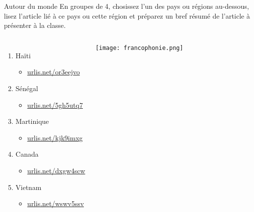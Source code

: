 \begin{frame}{Autour du monde}
  En groupes de 4, chosissez l'un des pays ou régions au-dessous, lisez l'article lié à ce pays ou cette région et préparez un bref résumé  de l'article à présenter à la classe.
  \begin{columns}
      \begin{enumerate}
        \item Haïti
        \begin{itemize}
          \item \href{https://urlis.net/or3eejvo}{urlis.net/or3eejvo}
        \end{itemize}
        \item Sénégal
        \begin{itemize}
          \item \href{https://urlis.net/5gh5utq7}{urlis.net/5gh5utq7}
        \end{itemize}
        \item Martinique
        \begin{itemize}
          \item \href{https://urlis.net/kjk9imxg}{urlis.net/kjk9imxg}
        \end{itemize}
        \item Canada
        \begin{itemize}
          \item \href{https://urlis.net/dxgw4scw}{urlis.net/dxgw4scw}
        \end{itemize}
        \item Vietnam
        \begin{itemize}
          \item \href{https://urlis.net/wswv5ssv}{urlis.net/wswv5ssv}
        \end{itemize}
      \end{enumerate}
      \begin{center}
        \texttt{[image: francophonie.png]}
      \end{center}
  \end{columns}
\end{frame}